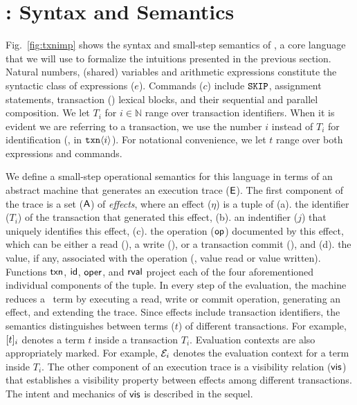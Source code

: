 \section{\txnimp: Syntax and Semantics}
\label{sec:opsem}

\label{sec:syntax}



Fig.~\ref{fig:txnimp} shows the syntax and small-step semantics of
\txnimp, a core language that we will use to formalize the intuitions
presented in the previous section. Natural numbers, (shared) variables
and arithmetic expressions constitute the syntactic class of
expressions ($e$).  Commands ($c$) include ${\tt SKIP}$, assignment
statements, transaction () lexical blocks, and their sequential
and parallel composition. We let $T_i$ for $i \in \mathbb{N}$ range
over transaction identifiers. When it is evident we are referring to a
transaction, we use the number $i$ instead of $T_i$ for identification
(\eg, in ${\tt txn}\langle i \rangle$). For notational convenience, we
let $t$ range over both expressions and commands.

We define a small-step operational semantics for this language in
terms of an abstract machine that generates an execution trace ($\textsf{E}$).
The first component of the trace is a set ($\textsf{A}$) of \emph{effects},
where an effect ($\eta$) is a tuple of (a). the identifier ($T_i$) of
the transaction that generated this effect, (b). an indentifier ($j$)
that uniquely identifies this effect, (c). the operation ($\textsf{op}$)
documented by this effect, which can be either a read (), a
write (), or a transaction commit (), and (d). the
value, if any, associated with the operation (\eg, value read or value
written). Functions $\textsf{txn}$, $\textsf{id}$, $\textsf{oper}$, and $\textsf{rval}$ project each
of the four aforementioned individual components of the tuple.
In every step of the evaluation, the machine reduces a \txnimp\ term
by executing a read, write or commit operation, generating an effect,
and extending the trace. Since effects include transaction
identifiers, the semantics distinguishes between terms ($t$) of
different transactions. For example, $\lbrack t \rbrack_i$ denotes a term $t$
inside a transaction $T_i$.  Evaluation contexts are also
appropriately marked. For example, $\mathcal{E}_i$ denotes the evaluation
context for a term inside $T_i$. The other component of an execution
trace is a visibility relation ($\textsf{vis}$) that establishes a visibility
property between effects among different transactions. The intent and
mechanics of $\textsf{vis}$ is described in the sequel.

